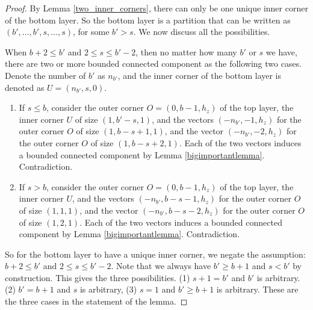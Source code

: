 \documentclass{amsart}[10pt]
\theoremstyle{plain}
\theoremstyle{definition}
\begin{document}
\begin{proof}
By Lemma \ref{two_inner_corners}, there can only be one unique inner corner of the bottom layer. So the bottom layer is a partition that can be written as $(b',...,b',s,...,s)$, for some $b' > s$. We now discuss all the possibilities. 

When $b+2 \leq b'$ and $2 \leq s \leq b'-2$, then no matter how many $b'$ or $s$ we have, there are two or more bounded connected component as the following two cases. Denote the number of $b'$ as $n_{b'}$, and the inner corner of the bottom layer is denoted as $U=(n_{b'}, s, 0)$. 

\begin{enumerate}
\item If $s \leq b$, consider the outer corner $O=(0, b-1, h_z)$ of the top layer, the inner corner $U$ of size $(1, b'-s, 1)$, and the vectors $(-n_{b'}, -1, h_z)$ for the outer corner $O$ of size $(1,b-s+1,1)$, and the vector $(-n_{b'}, -2, h_z)$ for the outer corner $O$ of size $(1,b-s+2,1)$. Each of the two vectors induces a bounded connected component by Lemma \ref{bigimportantlemma}. Contradiction.

\item If $s > b$, consider the outer corner $O=(0, b-1, h_z)$ of the top layer, the inner corner $U$, and the vectors $(-n_{b'}, b-s-1, h_z)$ for the outer corner $O$ of size $(1,1,1)$, and the vector $(-n_{b'}, b-s-2, h_z)$ for the outer corner $O$ of size $(1,2,1)$. Each of the two vectors induces a bounded connected component by Lemma \ref{bigimportantlemma}. Contradiction.
\end{enumerate}

So for the bottom layer to have a unique inner corner, we negate the assumption: $b+2 \leq b'$ and $2 \leq s \leq b'-2$. Note that we always have $b' \geq b+1$ and $s < b'$ by construction. This gives the three possibilities. (1) $s+1 = b'$ and $b'$ is arbitrary. (2) $b'=b+1$ and $s$ is arbitrary, (3) $s=1$ and $b' \geq b+1$ is arbitrary. These are the three cases in the statement of the lemma.  

\end{proof}
\end{document}
